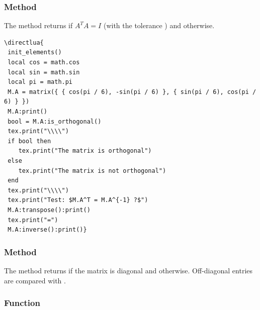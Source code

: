 \subsubsection{Method  }
\label{ssub:method_is_orthogonal}

The method returns  if $A^TA = I$ (with the tolerance ) and  otherwise.

\begin{verbatim}
\directlua{
 init_elements()
 local cos = math.cos
 local sin = math.sin
 local pi = math.pi
 M.A = matrix({ { cos(pi / 6), -sin(pi / 6) }, { sin(pi / 6), cos(pi / 6) } })
 M.A:print()
 bool = M.A:is_orthogonal()
 tex.print("\\\\")
 if bool then
 	tex.print("The matrix is orthogonal")
 else
 	tex.print("The matrix is not orthogonal")
 end
 tex.print("\\\\")
 tex.print("Test: $M.A^T = M.A^{-1} ?$")
 M.A:transpose():print()
 tex.print("=")
 M.A:inverse():print()}
\end{verbatim}


\subsubsection{Method }
\label{ssub:method_is_diagonal}

The method returns  if the matrix is diagonal and  otherwise. Off-diagonal entries are compared with .

\subsubsection{Function }
\label{ssub:display_a_table_or_array_function_code_print_array}

